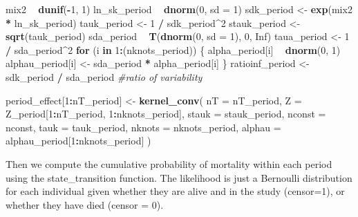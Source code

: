 \documentclass[11pt,]{article}
\newenvironment{Shaded}{\begin{snugshade}}{\end{snugshade}}
\newcommand{\KeywordTok}[1]{\textcolor[rgb]{0.13,0.29,0.53}{\textbf{#1}}}
\newcommand{\DataTypeTok}[1]{\textcolor[rgb]{0.13,0.29,0.53}{#1}}
\newcommand{\DecValTok}[1]{\textcolor[rgb]{0.00,0.00,0.81}{#1}}
\newcommand{\StringTok}[1]{\textcolor[rgb]{0.31,0.60,0.02}{#1}}
\newcommand{\CommentTok}[1]{\textcolor[rgb]{0.56,0.35,0.01}{\textit{#1}}}
\newcommand{\OtherTok}[1]{\textcolor[rgb]{0.56,0.35,0.01}{#1}}
\newcommand{\ControlFlowTok}[1]{\textcolor[rgb]{0.13,0.29,0.53}{\textbf{#1}}}
\newcommand{\OperatorTok}[1]{\textcolor[rgb]{0.81,0.36,0.00}{\textbf{#1}}}
\newcommand{\NormalTok}[1]{#1}
\begin{document}
\begin{Shaded}
\begin{Highlighting}[]
\NormalTok{ mix2 }\OperatorTok{~}\StringTok{ }\KeywordTok{dunif}\NormalTok{(}\OperatorTok{-}\DecValTok{1}\NormalTok{, }\DecValTok{1}\NormalTok{)}
\NormalTok{  ln_sk_period }\OperatorTok{~}\StringTok{ }\KeywordTok{dnorm}\NormalTok{(}\DecValTok{0}\NormalTok{, }\DataTypeTok{sd =} \DecValTok{1}\NormalTok{)}
\NormalTok{  sdk_period <-}\StringTok{ }\KeywordTok{exp}\NormalTok{(mix2 }\OperatorTok{*}\StringTok{ }\NormalTok{ln_sk_period)}
\NormalTok{  tauk_period <-}\StringTok{ }\DecValTok{1} \OperatorTok{/}\StringTok{ }\NormalTok{sdk_period}\OperatorTok{^}\DecValTok{2}
\NormalTok{  stauk_period <-}\StringTok{ }\KeywordTok{sqrt}\NormalTok{(tauk_period)}
\NormalTok{  sda_period }\OperatorTok{~}\StringTok{ }\KeywordTok{T}\NormalTok{(}\KeywordTok{dnorm}\NormalTok{(}\DecValTok{0}\NormalTok{, }\DataTypeTok{sd =} \DecValTok{1}\NormalTok{), }\DecValTok{0}\NormalTok{, }\OtherTok{Inf}\NormalTok{)}
\NormalTok{  taua_period <-}\StringTok{ }\DecValTok{1} \OperatorTok{/}\StringTok{ }\NormalTok{sda_period}\OperatorTok{^}\DecValTok{2}
  \ControlFlowTok{for}\NormalTok{ (i }\ControlFlowTok{in} \DecValTok{1}\OperatorTok{:}\NormalTok{(nknots_period)) \{}
\NormalTok{    alpha_period[i] }\OperatorTok{~}\StringTok{ }\KeywordTok{dnorm}\NormalTok{(}\DecValTok{0}\NormalTok{, }\DecValTok{1}\NormalTok{)}
\NormalTok{    alphau_period[i] <-}\StringTok{ }\NormalTok{sda_period }\OperatorTok{*}\StringTok{ }\NormalTok{alpha_period[i]}
\NormalTok{  \}}
\NormalTok{  ratioinf_period <-}\StringTok{ }\NormalTok{sdk_period }\OperatorTok{/}\StringTok{ }\NormalTok{sda_period }\CommentTok{#ratio of variability}
 
\NormalTok{  period_effect[}\DecValTok{1}\OperatorTok{:}\NormalTok{nT_period] <-}\StringTok{ }\KeywordTok{kernel_conv}\NormalTok{(}
    \DataTypeTok{nT =}\NormalTok{ nT_period,}
    \DataTypeTok{Z =}\NormalTok{ Z_period[}\DecValTok{1}\OperatorTok{:}\NormalTok{nT_period, }\DecValTok{1}\OperatorTok{:}\NormalTok{nknots_period],}
    \DataTypeTok{stauk =}\NormalTok{ stauk_period,}
    \DataTypeTok{nconst =}\NormalTok{ nconst,}
    \DataTypeTok{tauk =}\NormalTok{ tauk_period,}
    \DataTypeTok{nknots =}\NormalTok{ nknots_period,}
    \DataTypeTok{alphau =}\NormalTok{ alphau_period[}\DecValTok{1}\OperatorTok{:}\NormalTok{nknots_period]}
\NormalTok{  )}
\end{Highlighting}
\end{Shaded}

Then we compute the cumulative probability of mortality within each
period using the state\_transition function. The likelihood is just a
Bernoulli distribution for each individual given whether they are alive
and in the study (censor=1), or whether they have died (censor = 0).
\end{document}
